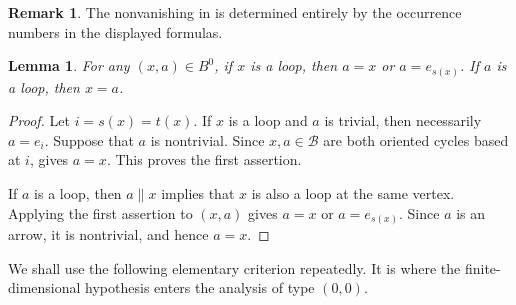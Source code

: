 \documentclass[11pt,a4paper,reqno]{amsart}
\newcommand{\mB}{\mathcal B}
\newcommand{\para}[2]{(#1,#2)}
\theoremstyle{plain}
\newtheorem{lemma}[lemma]{Lemma}
\theoremstyle{definition}
\newtheorem{remark}[remark]{Remark}
\numberwithin{equation}{section}
\begin{document}
	\begin{remark}
		The nonvanishing in  is determined entirely by the
		occurrence numbers in the displayed formulas.
	\end{remark}
	
	\begin{lemma}\label{x-is-loop}
		For any $\para{x}{a}\in B^0$, if $x$ is a loop, then
		$a=x$ or $a=e_{s(x)}$.  If $a$ is a loop, then $x=a$.
	\end{lemma}
	
	\begin{proof}
		Let $i=s(x)=t(x)$.  If $x$ is a loop and $a$ is trivial, then necessarily
		$a=e_i$.  Suppose that $a$ is nontrivial.  Since $x,a\in\mB$ are both
		oriented cycles based at $i$,  gives $a=x$.  This
		proves the first assertion.
		
		If $a$ is a loop, then $a\parallel x$ implies that $x$ is also a loop at the
		same vertex.  Applying the first assertion to $\para{x}{a}$ gives
		$a=x$ or $a=e_{s(x)}$.  Since $a$ is an arrow, it is nontrivial, and hence
		$a=x$.
	\end{proof}
	
	We shall use the following elementary criterion repeatedly.  It is where the
	finite-dimensional hypothesis enters the analysis of type $(0,0)$.
	
\end{document}
